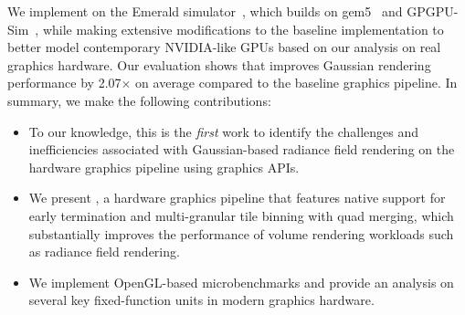 We implement \name{} on the Emerald simulator~\cite{gub:aam19}, which builds on
gem5~\cite{bin:bec11} and GPGPU-Sim~\cite{bak:yua09}, while making extensive
modifications to the baseline implementation to better model contemporary
NVIDIA-like GPUs based on our analysis on real graphics hardware.
%
Our evaluation shows that \name{} improves Gaussian rendering performance by
{2.07$\times$} on average compared to the baseline graphics pipeline.
%
In summary, we make the following contributions:
%
\begin{itemize}
%
\item To our knowledge, this is the \emph{first} work to identify the
challenges and inefficiencies associated with Gaussian-based radiance field
rendering on the hardware graphics pipeline using graphics APIs.

\item We present \name{}, a hardware graphics pipeline that features native
support for early termination and multi-granular tile binning with quad
merging, which substantially improves the performance of volume rendering
workloads such as radiance field rendering.

\item We implement OpenGL-based microbenchmarks and provide an analysis
on several key fixed-function units in modern graphics hardware.
%
\end{itemize}
